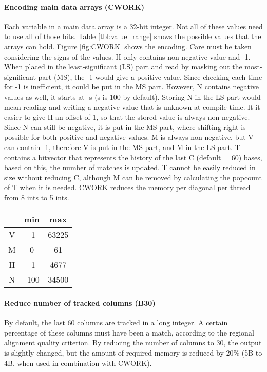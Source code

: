 \documentclass[../main/thesis.tex]{subfiles}
\begin{document}
\paragraph{Encoding main data arrays (CWORK)}
Each variable in a main data array is a 32-bit integer.
Not all of these values need to use all of those bits.
Table \ref{tbl:value_range} shows the possible values that the arrays can hold.
Figure \ref{fig:CWORK} shows the encoding.
Care must be taken considering the signs of the values.
H only contains non-negative value and -1.
When placed in the least-significant (LS) part and read by masking out the most-significant part (MS), the -1 would give a positive value.
Since checking each time for -1 is inefficient, it could be put in the MS part.
However, N contains negative values as well, it starts at -s (s is 100 by default).
Storing N in the LS part would mean reading and writing a negative value that is unknown at compile time.
It it easier to give H an offset of 1, so that the stored value is always non-negative.
Since N can still be negative, it is put in the MS part, where shifting right is possible for both positive and negative values.
M is always non-negative, but V can contain -1, therefore V is put in the MS part, and M in the LS part.
T contains a bitvector that represents the history of the last C (default = 60) bases, based on this, the number of matches is updated.
T cannot be easily reduced in size without reducing C, although M can be removed by calculating the popcount of T when it is needed.
CWORK reduces the memory per diagonal per thread from 8 ints to 5 ints.

\begin{table}
\centering
\begin{tabular}{c|c c}
& min & max \\ \hline
V & -1 & 63225 \\
M & 0 & 61 \\
H & -1 & 4677 \\
N & -100 & 34500 \\
\end{tabular}
\end{table}


\paragraph{Reduce number of tracked columns (B30)}
By default, the last 60 columns are tracked in a long integer.
A certain percentage of these columns must have been a match, according to the regional alignment quality criterion.
By reducing the number of columns to 30, the output is slightly changed, but the amount of required memory is reduced by 20\% (5B to 4B, when used in combination with CWORK).
\end{document}
